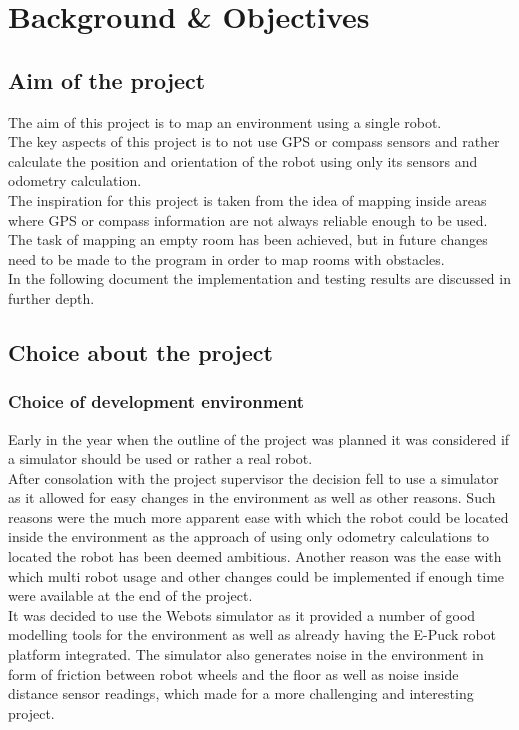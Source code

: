 \chapter{Background \& Objectives}
\label{Background}
\section{Aim of the project}
\label{aim}
The aim of this project is to map an environment using a single robot. \\
The key aspects of this project is to not use GPS or compass sensors and rather calculate the position and orientation of the robot using only its sensors and odometry calculation. \\
The inspiration for this project is taken from the idea of mapping inside areas where GPS or compass information are not always reliable enough to be used. \\[3ex]

The task of mapping an empty room has been achieved, but in future changes need to be made to the program in order to map rooms with obstacles.\\
In the following document the implementation and testing results are discussed in further depth.

\section{Choice about the project}
\subsection{Choice of development environment}
Early in the year when the outline of the project was planned it was considered if a simulator should be used or rather a real robot.\\
After consolation with the project supervisor the decision fell to use a simulator as it allowed for easy changes in the environment as well as other reasons. Such reasons were the much more apparent ease with which the robot could be located inside the environment as the approach of using only odometry calculations to located the robot has been deemed ambitious. Another reason was the ease with which multi robot usage and other changes could be implemented if enough time were available at the end of the project.\\
It was decided to use the Webots\textsuperscript{\texttrademark} simulator as it provided a number of good modelling tools for the environment as well as already having the E-Puck robot platform integrated. The simulator also generates noise in the environment in form of friction between robot wheels and the floor as well as noise inside distance sensor readings, which made for a more challenging and interesting project.

